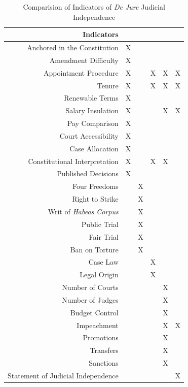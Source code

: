 \documentclass[12pt]{article}
\begin{document}
\begin{landscape}
	\begin{table}[tb]\centering\caption{Comparision of Indicators of \textit{De Jure} Judicial Independence}\label{otherindicators}\small
		\begin{tabular}{rccccc}\hline
			Indicators	&	\citet{Feld2003}	&	\citet{Keith2002a}	&	\citet{Laporta2004}	&	\citet{Rios2006}	&	\citet{Melton2014}	\\\hline
			Anchored in the Constitution	&	X	&		&		&		&		\\
			Amendment Difficulty	&	X	&		&		&		&		\\
			Appointment Procedure	&	X	&		&	X	&	X	&	X	\\
			Tenure	&	X	&		&	X	&	X	&	X	\\
			Renewable Terms	&	X	&		&		&		&		\\
			Salary Insulation	&	X	&		&		&	X	&	X	\\
			Pay Comparison	&	X	&		&		&		&		\\
			Court Accessibility	&	X	&		&		&		&		\\
			Case Allocation	&	X	&		&		&		&		\\
			Constitutional Interpretation	&	X	&		&	X	&	X	&		\\
			Published Decisions	&	X	&		&		&		&		\\
			Four Freedoms	&		&	X	&		&		&		\\
			Right to Strike	&		&	X	&		&		&		\\
			Writ of \textit{Habeas Corpus}	&		&	X	&		&		&		\\
			Public Trial	&		&	X	&		&		&		\\
			Fair Trial	&		&	X	&		&		&		\\
			Ban on Torture	&		&	X	&		&		&		\\
			Case Law	&		&		&	X	&		&		\\
			Legal Origin	&		&		&	X	&		&		\\
			Number of Courts	&		&		&		&	X	&		\\
			Number of Judges	&		&		&		&	X	&		\\
			Budget Control	&		&		&		&	X	&		\\
			Impeachment	&		&		&		&	X	&	X	\\
			Promotions	&		&		&		&	X	&		\\
			Transfers	&		&		&		&	X	&		\\
			Sanctions	&		&		&		&	X	&		\\
			Statement of Judicial Independence	&		&		&		&		&	X	\\\hline
		\end{tabular}
	\end{table}
\end{landscape}
\restoregeometry
\end{document}
